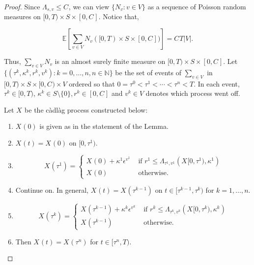 \documentclass[12pt]{article}
\newcommand{\mb}{\mathbb}
\newcommand{\te}{\text}
\newcommand{\ep}{\epsilon}
\newcommand{\ind}{\hspace{24pt}}
\newcommand{\ex}[1]{\mb{E}\left[#1\right]}			%
\renewcommand{\v}{v}							%
\renewcommand{\S}{S}							%
\newcommand{\ev}[1]{\ep^{#1}}					%
\newcommand{\T}{T}								%
\renewcommand{\t}{t}							%
\renewcommand{\tt}{s}							%
\newcommand{\poiss}[1]{N_{#1}}						%
\newcommand{\V}{V}									%
\renewcommand{\r}{r}								%
\newcommand{\rt}[1]{\tau^{#1}}						%
\renewcommand{\it}{k}								%
\newcommand{\numb}{n}								%
\newcommand{\rxvt}[2]{X_{#1}{(#2)}}					%
\newcommand{\rxvts}[2]{X_{#1}{#2}}					%
\newcommand{\ratee}[1]{\Lambda_{#1}}				%
\newcommand{\const}[1]{C_{#1}}						%
\renewcommand{\mark}[1]{\kappa^{#1}}				%
\begin{document}
\begin{proof}
Since \(\ratee{\tt,\v} \leq \const{}\), we can view \(\{\poiss{\v}:\v\in\V\}\) as a sequence of Poisson random measures on \([0,\T)\times \S\times [0,\const{}]\). Notice that,

\[\ex{\sum_{\v\in\V}\poiss{\v}([0,\T)\times\S\times[0,\const{}])} = \const{}\T|\V|.\]

Thus, \(\sum_{\v\in\V}\poiss{\v}\) is an almost surely finite measure on \([0,\T)\times \S\times [0,\const{}]\). Let \(\{(\rt{\it},\mark{\it},\r^\it,\v^\it):\it = 0,\dots,\numb, \numb\in \mb{N}\}\) be the set of events of \(\sum_{\v\in\V}\) in \([0,\T)\times\S\times [0,\const{})\times \V\) ordered so that \(0=\rt{0} < \rt{1} < \cdots < \rt{\numb} < \T\). In each event, \(\rt{\it} \in [0,\T)\), \(\mark{\it}\in \S\setminus\{0\}, \r^\it \in [0,\const{}]\) and \(\v^\it \in \V\) denotes which process went off.

\ind Let \(\rxvts{}{}\) be the c\`adl\`ag process constructed below:

\begin{enumerate}
\item \(\rxvt{}{0}\) is given as in the statement of the Lemma.

\item \(\rxvt{}{\t} = \rxvt{}{0}\) on \([0,\rt{1})\).

\item 

\[\rxvt{}{\rt{1}} = \begin{cases}
\rxvt{}{0} + \mark{1}\ev{\v^1} &\te{ if } \r^1 \leq \ratee{\rt{1},\v^1}(\rxvts{}{[0,\rt{1})},\mark{1})\\
\rxvt{}{0} &\te{ otherwise.}
\end{cases}
\] 

\item Continue on. In general, \(\rxvt{}{\t} = \rxvt{}{\rt{\it-1}}\) on \(\t \in [\rt{\it-1},\rt{\it})\) for \(\it= 1,\dots,\numb\).

\item 

\[\rxvt{}{\rt{\it}} = \begin{cases}
\rxvt{}{\rt{\it-1}} + \mark{\it}\ev{\v^\it} &\te{ if } \r^\it \leq \ratee{\rt{\it},\v^\it}(\rxvts{}{[0,\rt{\it})},\mark{\it})\\
\rxvt{}{\rt{\it-1}} &\te{ otherwise.}
\end{cases}\]

\item Then \(\rxvt{}{\t} = \rxvt{}{\rt{\numb}}\) for \(\t\in [\rt{\numb},\T)\).
\end{enumerate}


\end{proof}
\end{document}
